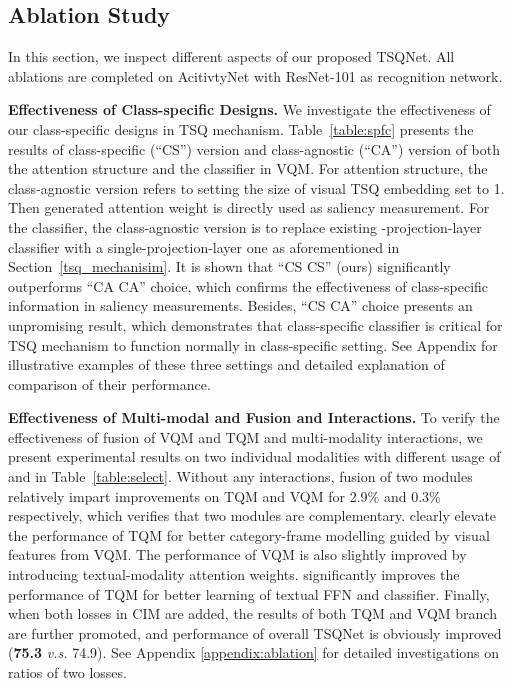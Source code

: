 \documentclass[runningheads]{llncs}
\newcommand{\tabref}[1]{Table~\ref{#1}}
\newcommand{\secref}[1]{Section~\ref{#1}}
\begin{document}
\subsection{Ablation Study}
\label{exp:ablation}


In this section, we inspect different aspects of our proposed TSQNet. All ablations are completed on AcitivtyNet with ResNet-101 as recognition network. 


\noindent \textbf{Effectiveness of Class-specific Designs.}
We investigate the effectiveness of our class-specific designs in TSQ mechanism. 
\tabref{table:spfc} presents the results of class-specific (``CS'') version and class-agnostic (``CA'') version of both the attention structure and the classifier in VQM. 
For attention structure, the class-agnostic version refers to setting the size of visual TSQ embedding set  to 1. Then generated attention weight  is directly used as saliency measurement. For the classifier, the class-agnostic version is to replace existing -projection-layer classifier with a single-projection-layer one as aforementioned in \secref{tsq_mechanisim}. 
It is shown that ``CS CS'' (ours) significantly outperforms ``CA CA'' choice, which confirms the effectiveness of class-specific information in saliency measurements. Besides, ``CS CA'' choice presents an unpromising result, which demonstrates that class-specific classifier is critical for TSQ mechanism to function normally in class-specific setting. See Appendix for illustrative examples of these three settings and detailed explanation of comparison of their performance.


\noindent\textbf{Effectiveness of Multi-modal and Fusion and Interactions.}
To verify the effectiveness of fusion of VQM and TQM and multi-modality interactions, we present experimental results on two individual modalities with different usage of  and  in \tabref{table:select}. 
Without any interactions, fusion of two modules relatively impart improvements on TQM and VQM for 2.9\% and 0.3\% respectively, which verifies that two modules are complementary.  clearly elevate the performance of TQM for better category-frame modelling guided by visual features from VQM. The performance of VQM is also slightly improved by introducing textual-modality attention weights.  significantly improves the performance of TQM for better learning of textual FFN and classifier.
Finally, when both losses in CIM are added, the results of both TQM and VQM branch are further promoted, and performance of overall TSQNet is obviously improved (\textbf{75.3} \emph{v.s.} 74.9). See Appendix \ref{appendix:ablation} for detailed investigations on ratios of two losses. 
\end{document}
